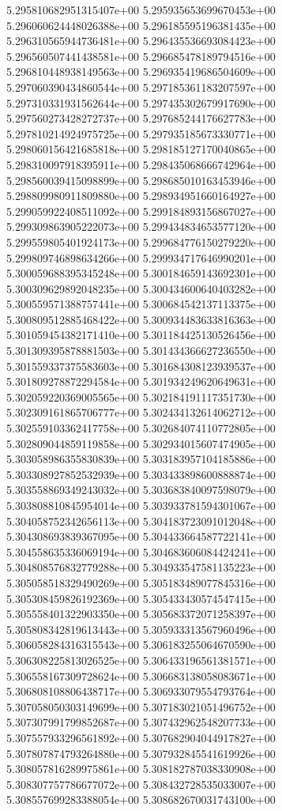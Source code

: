 5.295810682951315407e+00
5.295935653699670453e+00
5.296060624448026388e+00
5.296185595196381435e+00
5.296310565944736481e+00
5.296435536693084423e+00
5.296560507441438581e+00
5.296685478189794516e+00
5.296810448938149563e+00
5.296935419686504609e+00
5.297060390434860544e+00
5.297185361183207597e+00
5.297310331931562644e+00
5.297435302679917690e+00
5.297560273428272737e+00
5.297685244176627783e+00
5.297810214924975725e+00
5.297935185673330771e+00
5.298060156421685818e+00
5.298185127170040865e+00
5.298310097918395911e+00
5.298435068666742964e+00
5.298560039415098899e+00
5.298685010163453946e+00
5.298809980911809880e+00
5.298934951660164927e+00
5.299059922408511092e+00
5.299184893156867027e+00
5.299309863905222073e+00
5.299434834653577120e+00
5.299559805401924173e+00
5.299684776150279220e+00
5.299809746898634266e+00
5.299934717646990201e+00
5.300059688395345248e+00
5.300184659143692301e+00
5.300309629892048235e+00
5.300434600640403282e+00
5.300559571388757441e+00
5.300684542137113375e+00
5.300809512885468422e+00
5.300934483633816363e+00
5.301059454382171410e+00
5.301184425130526456e+00
5.301309395878881503e+00
5.301434366627236550e+00
5.301559337375583603e+00
5.301684308123939537e+00
5.301809278872294584e+00
5.301934249620649631e+00
5.302059220369005565e+00
5.302184191117351730e+00
5.302309161865706777e+00
5.302434132614062712e+00
5.302559103362417758e+00
5.302684074110772805e+00
5.302809044859119858e+00
5.302934015607474905e+00
5.303058986355830839e+00
5.303183957104185886e+00
5.303308927852532939e+00
5.303433898600888874e+00
5.303558869349243032e+00
5.303683840097598079e+00
5.303808810845954014e+00
5.303933781594301067e+00
5.304058752342656113e+00
5.304183723091012048e+00
5.304308693839367095e+00
5.304433664587722141e+00
5.304558635336069194e+00
5.304683606084424241e+00
5.304808576832779288e+00
5.304933547581135223e+00
5.305058518329490269e+00
5.305183489077845316e+00
5.305308459826192369e+00
5.305433430574547415e+00
5.305558401322903350e+00
5.305683372071258397e+00
5.305808342819613443e+00
5.305933313567960496e+00
5.306058284316315543e+00
5.306183255064670590e+00
5.306308225813026525e+00
5.306433196561381571e+00
5.306558167309728624e+00
5.306683138058083671e+00
5.306808108806438717e+00
5.306933079554793764e+00
5.307058050303149699e+00
5.307183021051496752e+00
5.307307991799852687e+00
5.307432962548207733e+00
5.307557933296561892e+00
5.307682904044917827e+00
5.307807874793264880e+00
5.307932845541619926e+00
5.308057816289975861e+00
5.308182787038330908e+00
5.308307757786677072e+00
5.308432728535033007e+00
5.308557699283388054e+00
5.308682670031743100e+00
